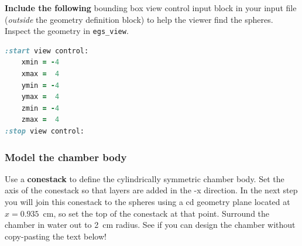 \documentclass[12pt,twoside]{article}
\begin{document}
\textbf{Include the following} bounding
box view control input block in your input file (\textit{outside} the geometry
definition block) to help the viewer find the spheres. Inspect the geometry in
\Verb|egs_view|.

{\small
\begin{lstlisting}[language=ruby,backgroundcolor=\color{white}]
:start view control:
    xmin = -4
    xmax =  4
    ymin = -4
    ymax =  4
    zmin = -4
    zmax =  4
:stop view control:
\end{lstlisting}
}

\subsubsection{Model the chamber body}

Use a \textbf{conestack} to define the cylindrically symmetric chamber body.
Set the axis of the conestack so that layers are added in the -x direction. In
the next step you will join this conestack to the spheres using a cd geometry
plane located at $x=0.935$~cm, so set the top of the conestack at that point.
Surround the chamber in water out to 2~cm radius. See if you can design the
chamber without copy-pasting the text below!
\end{document}
